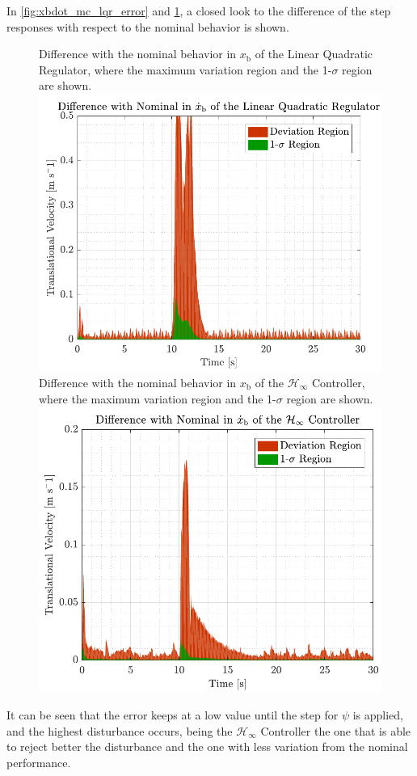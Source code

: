 In \autoref{fig:xbdot_mc_lqr_error} and \ref{fig:xbdot_mc_rob_error}, a closed look to the difference of the step responses with respect to the nominal behavior is shown.
\begin{figure}[H]
    \captionbox 
    {   
        Difference with the nominal behavior in $x_\mathrm{b}$ of the Linear Quadratic Regulator, where the maximum variation region and the 1-$\sigma$ region are shown.
        \label{fig:xbdot_mc_lqr_error}
    }                                                                 
    {                                                                  
        \includegraphics[width=.45\textwidth]{figures/xbdot_mc_lqr_error}         
    }                                                                    
    \hspace{5pt}                                                          
    \captionbox  
    {      
         Difference with the nominal behavior in $x_\mathrm{b}$ of the $\mathcal{H}_\infty$ Controller, where the maximum variation region and the 1-$\sigma$ region are shown.
        \label{fig:xbdot_mc_rob_error}
    }                                                                          
    {
        \includegraphics[width=.45\textwidth]{figures/xbdot_mc_rob_error}
    }
\end{figure}

It can be seen that the error keeps at a low value until the step for $\psi$ is applied, and the highest disturbance occurs, being the $\mathcal{H}_\infty$ Controller the one that is able to reject better the disturbance and the one with less variation from the nominal performance.

